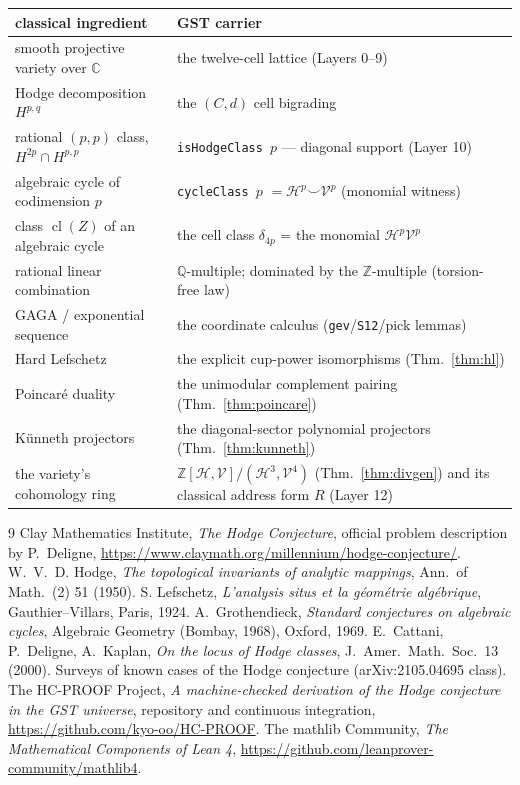 \documentclass[11pt,a4paper]{article}
\theoremstyle{plain}
\theoremstyle{definition}
\newcommand{\Z}{\mathbb{Z}}
\newcommand{\Q}{\mathbb{Q}}
\newcommand{\C}{\mathbb{C}}
\newcommand{\HC}{\mathcal{H}}
\newcommand{\VV}{\mathcal{V}}
\DeclareMathOperator{\cl}{cl}
\newcommand{\cupop}{\smile}
\begin{document}
\begingroup\small
\begin{longtable}{@{}p{6.1cm}p{9.0cm}@{}}
\toprule
classical ingredient & GST carrier \\
\midrule
smooth projective variety over $\C$ & the twelve-cell lattice
  (Layers 0--9) \\
Hodge decomposition $H^{p,q}$ & the $(C,d)$ cell bigrading \\
rational $(p,p)$ class, $H^{2p}\cap H^{p,p}$ &
  \texttt{isHodgeClass $p$} --- diagonal support (Layer 10) \\
algebraic cycle of codimension $p$ &
  \texttt{cycleClass $p$} $= \HC^{p}\cupop\VV^{p}$ (monomial witness) \\
class $\cl(Z)$ of an algebraic cycle &
  the cell class $\delta_{4p}$ = the monomial $\HC^{p}\VV^{p}$ \\
rational linear combination & $\Q$-multiple; dominated by the
  $\Z$-multiple (torsion-free law) \\
GAGA / exponential sequence & the coordinate calculus
  (\texttt{gev}/\texttt{S12}/pick lemmas) \\
Hard Lefschetz & the explicit cup-power isomorphisms
  (Thm.~\ref{thm:hl}) \\
Poincar\'e duality & the unimodular complement pairing
  (Thm.~\ref{thm:poincare}) \\
K\"unneth projectors & the diagonal-sector polynomial projectors
  (Thm.~\ref{thm:kunneth}) \\
the variety's cohomology ring &
  $\Z[\HC,\VV]/(\HC^{3},\VV^{4})$ (Thm.~\ref{thm:divgen})
  and its classical address form $R$ (Layer 12) \\
\bottomrule
\end{longtable}
\endgroup

\begin{thebibliography}{9}
\small
{} Clay Mathematics Institute, \emph{The Hodge Conjecture},
  official problem description by P.\ Deligne,
  \url{https://www.claymath.org/millennium/hodge-conjecture/}.
 W.~V.~D. Hodge, \emph{The topological invariants of
  analytic mappings}, Ann.\ of Math.\ (2) 51 (1950).
 S. Lefschetz, \emph{L'analysis situs et la
  g\'eom\'etrie alg\'ebrique}, Gauthier--Villars, Paris, 1924.
 A.\ Grothendieck, \emph{Standard conjectures on
  algebraic cycles}, Algebraic Geometry (Bombay, 1968), Oxford, 1969.
 E.~Cattani, P.\ Deligne, A.\ Kaplan, \emph{On the locus of
  Hodge classes}, J.\ Amer.\ Math.\ Soc.\ 13 (2000).
 Surveys of known cases of the Hodge conjecture
  (arXiv:2105.04695 class).
 The HC-PROOF Project, \emph{A machine-checked derivation of
  the Hodge conjecture in the GST universe}, repository and continuous
  integration, \url{https://github.com/kyo-oo/HC-PROOF}.
 The mathlib Community, \emph{The Mathematical Components
  of Lean 4}, \url{https://github.com/leanprover-community/mathlib4}.
\end{thebibliography}
\end{document}

